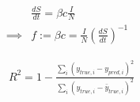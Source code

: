 \documentclass[11pt]{article}
\begin{document}
\begin{align*}
    & \frac{dS}{dt} = \beta c \frac{I}{N} \\
    \implies &f := \beta c = \frac{I}{N} \left(\frac{dS}{dt}\right)^{-1}
\end{align*}

\begin{align*}
& R^2 = 1 - \frac{\sum_i (y_{true, i} - y_{pred, i})^2}{\sum_i (y_{true, i} - \bar{y}_{true,i})^2}
\end{align*}
\end{document}
